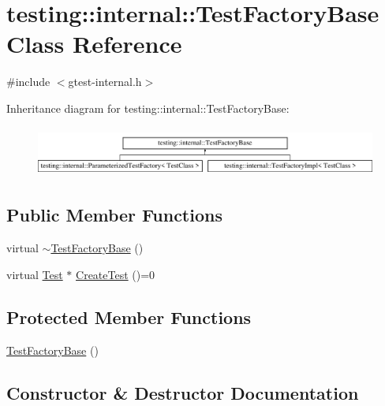 \hypertarget{classtesting_1_1internal_1_1TestFactoryBase}{}\section{testing\+::internal\+::Test\+Factory\+Base Class Reference}
\label{classtesting_1_1internal_1_1TestFactoryBase}


{\ttfamily \#include $<$gtest-\/internal.\+h$>$}

Inheritance diagram for testing\+::internal\+::Test\+Factory\+Base\+:\begin{figure}[H]
\begin{center}
\leavevmode
\includegraphics[height=1.666667cm]{classtesting_1_1internal_1_1TestFactoryBase}
\end{center}
\end{figure}
\subsection*{Public Member Functions}
\begin{DoxyCompactItemize}
\item 
virtual \mbox{\hyperlink{classtesting_1_1internal_1_1TestFactoryBase_a18f22a7594336a36642289c1decddc9e}{$\sim$\+Test\+Factory\+Base}} ()
\item 
virtual \mbox{\hyperlink{classtesting_1_1Test}{Test}} $\ast$ \mbox{\hyperlink{classtesting_1_1internal_1_1TestFactoryBase_a07ac3ca0b196cdb092da0bb186b7c030}{Create\+Test}} ()=0
\end{DoxyCompactItemize}
\subsection*{Protected Member Functions}
\begin{DoxyCompactItemize}
\item 
\mbox{\hyperlink{classtesting_1_1internal_1_1TestFactoryBase_afedbf147b2a213517b315880d8c81427}{Test\+Factory\+Base}} ()
\end{DoxyCompactItemize}


\subsection{Constructor \& Destructor Documentation}
\mbox{\label{classtesting_1_1internal_1_1TestFactoryBase_a18f22a7594336a36642289c1decddc9e}} 
